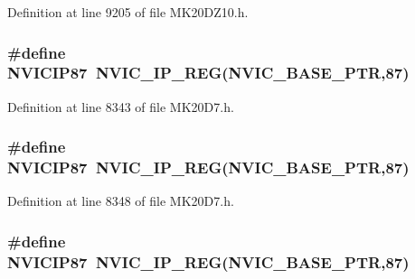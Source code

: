 Definition at line 9205 of file M\+K20\+D\+Z10.\+h.

\subsubsection[{\texorpdfstring{N\+V\+I\+C\+I\+P87}{NVICIP87}}]{\setlength{\rightskip}{0pt plus 5cm}\#define N\+V\+I\+C\+I\+P87~{\bf N\+V\+I\+C\+\_\+\+I\+P\+\_\+\+R\+EG}({\bf N\+V\+I\+C\+\_\+\+B\+A\+S\+E\+\_\+\+P\+TR},87)}\hypertarget{group___n_v_i_c___register___accessor___macros_ga2a3105fada5206e1b45c80116336b436}{}\label{group___n_v_i_c___register___accessor___macros_ga2a3105fada5206e1b45c80116336b436}


Definition at line 8343 of file M\+K20\+D7.\+h.

\subsubsection[{\texorpdfstring{N\+V\+I\+C\+I\+P87}{NVICIP87}}]{\setlength{\rightskip}{0pt plus 5cm}\#define N\+V\+I\+C\+I\+P87~{\bf N\+V\+I\+C\+\_\+\+I\+P\+\_\+\+R\+EG}({\bf N\+V\+I\+C\+\_\+\+B\+A\+S\+E\+\_\+\+P\+TR},87)}\hypertarget{group___n_v_i_c___register___accessor___macros_ga2a3105fada5206e1b45c80116336b436}{}\label{group___n_v_i_c___register___accessor___macros_ga2a3105fada5206e1b45c80116336b436}


Definition at line 8348 of file M\+K20\+D7.\+h.

\subsubsection[{\texorpdfstring{N\+V\+I\+C\+I\+P87}{NVICIP87}}]{\setlength{\rightskip}{0pt plus 5cm}\#define N\+V\+I\+C\+I\+P87~{\bf N\+V\+I\+C\+\_\+\+I\+P\+\_\+\+R\+EG}({\bf N\+V\+I\+C\+\_\+\+B\+A\+S\+E\+\_\+\+P\+TR},87)}\hypertarget{group___n_v_i_c___register___accessor___macros_ga2a3105fada5206e1b45c80116336b436}{}\label{group___n_v_i_c___register___accessor___macros_ga2a3105fada5206e1b45c80116336b436}


